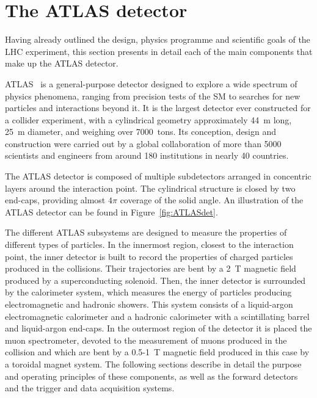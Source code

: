 \section{The ATLAS detector}
\label{sec:ATLAS}

Having already outlined the design, physics programme and scientific goals of the LHC experiment, this section presents in detail each of the main components that make up the ATLAS detector.

ATLAS~\cite{ATLAS:exp,ATLAS_run3} is a general-purpose detector designed to explore a wide spectrum of physics phenomena, ranging from precision tests of the SM to searches for new particles and interactions beyond it. It is the largest 
detector ever constructed for a collider experiment, with a cylindrical geometry approximately 44~m long, 25~m diameter, and weighing over 7000~tons. Its conception, design and construction were carried out by a global collaboration of more than 5000 scientists and engineers from around 180 institutions in nearly 40 countries.

The ATLAS detector is composed of multiple subdetectors arranged in concentric layers 
around the interaction point. The cylindrical structure is closed by two end-caps, providing almost $4\pi$ coverage of the solid angle. An illustration of the ATLAS detector can be found in Figure~\ref{fig:ATLASdet}.

The different ATLAS subsystems are designed to measure the properties of different types of particles. In the innermost region, closest to the interaction point, the inner detector is built to record the properties of charged particles produced in the collisions. Their trajectories 
are bent by a 2~T magnetic field produced by a superconducting solenoid. Then, the inner detector is surrounded by the calorimeter system, which measures the energy of particles producing electromagnetic and hadronic showers. This system consists of a liquid-argon electromagnetic calorimeter and a hadronic calorimeter with a scintillating barrel and liquid-argon end-caps.
In the outermost region of the detector it is placed the muon spectrometer, devoted to the measurement of muons produced in the collision and which are bent by a 0.5-1~T magnetic field produced in this case by a toroidal magnet system.
The following sections describe in detail the purpose and operating principles of these components, as well as the forward detectors and the trigger and data acquisition systems.

